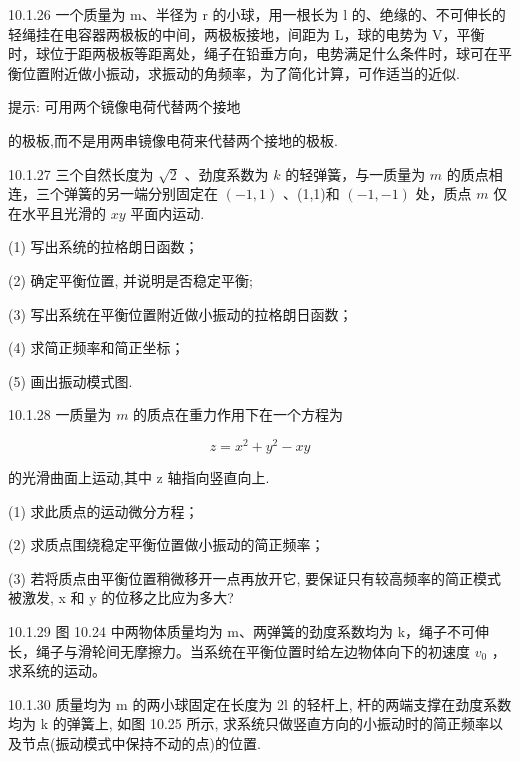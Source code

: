 \begin{problem}{10.1.26}
一个质量为 m、半径为 r 的小球，用一根长为 l 的、绝缘的、不可伸长的轻绳挂在电容器两极板的中间，两极板接地，间距为 L，球的电势为 V，平衡时，球位于距两极板等距离处，绳子在铅垂方向，电势满足什么条件时，球可在平衡位置附近做小振动，求振动的角频率，为了简化计算，可作适当的近似.

提示: 可用两个镜像电荷代替两个接地

的极板,而不是用两串镜像电荷来代替两个接地的极板.
\end{problem}
\clearpage


\begin{problem}{10.1.27}
三个自然长度为 $\sqrt{2}$ 、劲度系数为 $k$ 的轻弹簧，与一质量为 $m$ 的质点相连，三个弹簧的另一端分别固定在 $(-1,1)$ 、(1,1)和 $(-1,-1)$ 处，质点 $m$ 仅在水平且光滑的 $xy$ 平面内运动.

(1) 写出系统的拉格朗日函数；

(2) 确定平衡位置, 并说明是否稳定平衡;

(3) 写出系统在平衡位置附近做小振动的拉格朗日函数；

(4) 求简正频率和简正坐标；

(5) 画出振动模式图.
\end{problem}
\clearpage


\begin{problem}{10.1.28}
一质量为 $m$ 的质点在重力作用下在一个方程为

\[
z = x ^ {2} + y ^ {2} - x y
\]

的光滑曲面上运动,其中 z 轴指向竖直向上.

(1) 求此质点的运动微分方程；

(2) 求质点围绕稳定平衡位置做小振动的简正频率；

(3) 若将质点由平衡位置稍微移开一点再放开它, 要保证只有较高频率的简正模式被激发, x 和 y 的位移之比应为多大?
\end{problem}
\clearpage


\begin{problem}{10.1.29}
图 10.24 中两物体质量均为 m、两弹簧的劲度系数均为 k，绳子不可伸长，绳子与滑轮间无摩擦力。当系统在平衡位置时给左边物体向下的初速度 $v_{0}$ ，求系统的运动。
\begin{center}

\end{center}
\end{problem}
\clearpage


\begin{problem}{10.1.30}
质量均为 m 的两小球固定在长度为 2l 的轻杆上, 杆的两端支撑在劲度系数均为 k 的弹簧上, 如图 10.25 所示, 求系统只做竖直方向的小振动时的简正频率以及节点(振动模式中保持不动的点)的位置.
\begin{center}

\end{center}
\end{problem}
\clearpage


